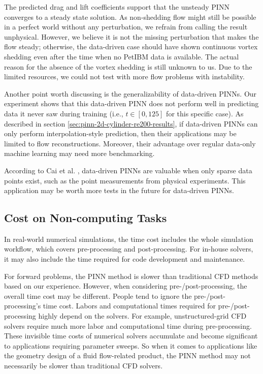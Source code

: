The predicted drag and lift coefficients support that the unsteady PINN converges to a steady state solution.
As non-shedding flow might still be possible in a perfect world without any perturbation, we refrain from calling the result unphysical.
However, we believe it is not the missing perturbation that makes the flow steady; otherwise, the data-driven case should have shown continuous vortex shedding even after the time when no PetIBM data is available.
The actual reason for the absence of the vortex shedding is still unknown to us.
Due to the limited resources, we could not test with more flow problems with instability.

Another point worth discussing is the generalizability of data-driven PINNs.
Our experiment shows that this data-driven PINN does not perform well in predicting data it never saw during training (i.e., $t \in [0, 125]$ for this specific case).
As described in section \ref{sec:pinn-2d-cylinder-re200-results}, if data-driven PINNs can only perform interpolation-style prediction, then their applications may be limited to flow reconstructions.
Moreover, their advantage over regular data-only machine learning may need more benchmarking.

According to Cai et al. \cite{cai_physics-informed_2021}, data-driven PINNs are valuable when only sparse data points exist, such as the point measurements from physical experiments.
This application may be worth more tests in the future for data-driven PINNs.

\subsection*{Cost on Non-computing Tasks}

In real-world numerical simulations, the time cost includes the whole simulation workflow, which covers pre-processing and post-processing.
For in-house solvers, it may also include the time required for code development and maintenance.

For forward problems, the PINN method is slower than traditional CFD methods based on our experience.
However, when considering pre-/post-processing, the overall time cost may be different.
People tend to ignore the pre-/post-processing's time cost.
Labors and computational times required for pre-/post-processing highly depend on the solvers.
For example, unstructured-grid CFD solvers require much more labor and computational time during pre-processing.
These invisible time costs of numerical solvers accumulate and become significant to applications requiring parameter sweeps.
So when it comes to applications like the geometry design of a fluid flow-related product, the PINN method may not necessarily be slower than traditional CFD solvers.

